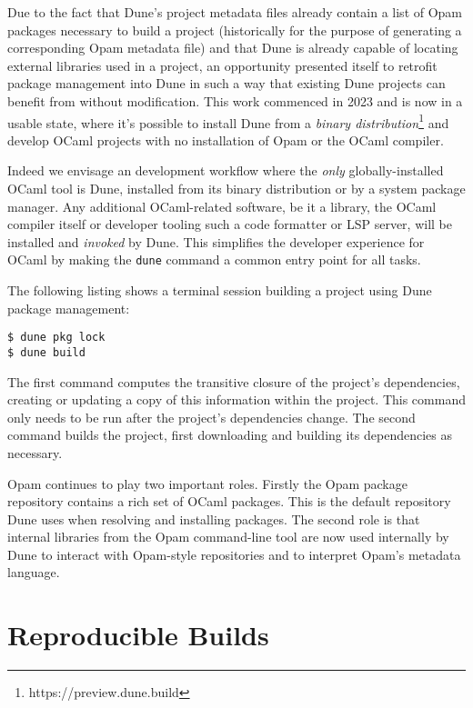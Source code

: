 \documentclass{article}
\begin{document}
\begin{multicols}{2}
        Due to the fact that Dune's project metadata files already contain a
        list of Opam packages necessary to build a project (historically for the
        purpose of generating a corresponding Opam metadata file) and that Dune
        is already capable of locating external libraries used in a project, an
        opportunity presented itself to retrofit package management into Dune in
        such a way that existing Dune projects can benefit from without
        modification. This work commenced in 2023 and is now in a usable state,
        where it's possible to install Dune from a \textit{binary
        distribution}\footnote{https://preview.dune.build} and develop OCaml
        projects with no installation of Opam or the OCaml compiler.

        Indeed we envisage an development workflow where the \textit{only}
        globally-installed OCaml tool is Dune, installed from its binary
        distribution or by a system package manager. Any additional
        OCaml-related software, be it a library, the OCaml compiler itself or
        developer tooling such a code formatter or LSP server, will be installed
        and \textit{invoked} by Dune. This simplifies the developer experience
        for OCaml by making the \texttt{dune} command a common entry point for all
        tasks.

        The following listing shows a terminal session building a project using
        Dune package management:
        \begin{lstlisting}
$ dune pkg lock
$ dune build
        \end{lstlisting}

        The first command computes the transitive closure of the project's
        dependencies, creating or updating a copy of this information within the
        project. This command only needs to be run after the project's
        dependencies change. The second command builds the project, first
        downloading and building its dependencies as necessary.

        Opam continues to play two important roles. Firstly the Opam package
        repository contains a rich set of OCaml packages. This is the default
        repository Dune uses when resolving and installing packages. The second
        role is that internal libraries from the Opam command-line tool are now
        used internally by Dune to interact with Opam-style repositories and to
        interpret Opam's metadata language.

        \section {Reproducible Builds}


\end{multicols}
\end{document}
